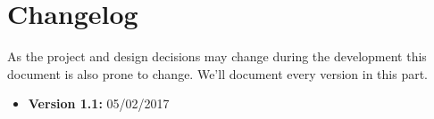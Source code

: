 \documentclass[a4paper]{article}
\begin{document}
\section{Changelog}
As the project and design decisions may change during the development this document is also prone to change.
We'll document every version in this part.
\begin{itemize}
\item \textbf {Version 1.1:} 05/02/2017
\end{itemize}
\end{document}
